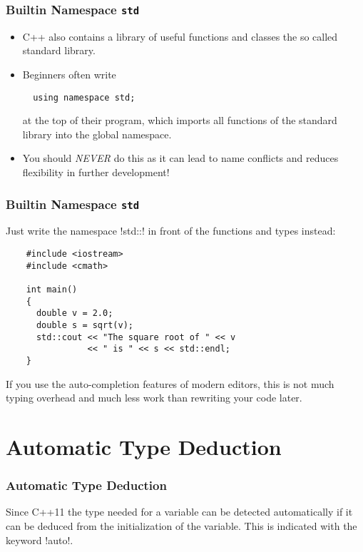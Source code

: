 \begin{frame}[fragile]
  \frametitle{Builtin Namespace \texttt{std}}
  \begin{itemize}
  \item C++ also contains a library of useful functions and classes the so called standard library. 
  \item Beginners often write 
  \begin{lstlisting}
  using namespace std;
  \end{lstlisting}
at the top of their program, which imports all functions of the standard library into the global namespace.
  \item You should \emph{NEVER} do this as it can lead to name conflicts and reduces flexibility in further development!
  \end{itemize}
  
\end{frame}

\begin{frame}[fragile]
  \frametitle<presentation>{Builtin Namespace \texttt{std}}
Just write the namespace \inline!std::! in front of the functions and types instead:
  \begin{lstlisting}
    #include <iostream>
    #include <cmath>

    int main()
    {
      double v = 2.0;
      double s = sqrt(v);
      std::cout << "The square root of " << v
                << " is " << s << std::endl;
    }
  \end{lstlisting}
  If you use the auto-completion features of modern editors, this is not much typing overhead and much less work than rewriting your code later.
\end{frame}

\section{Automatic Type Deduction}

\begin{frame}
\frametitle<presentation>{Automatic Type Deduction}

Since C++11 the type needed for a variable can be detected automatically if it can be deduced from the initialization of the variable. This is indicated with the keyword \inline!auto!.



\end{frame}

